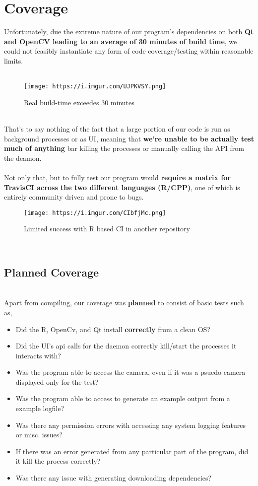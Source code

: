 \documentclass[12pt]{article}
\begin{document}
\section*{Coverage}
Unfortunately, due the extreme nature of our program's dependencies on both \textbf{Qt and OpenCV leading to an average of 30 minutes of build time}, we could not feasibly instantiate any form of code coverage/testing within reasonable limits.\\
\\\begin{figure}[width=0.25\textwidth]
    \centering
    \texttt{[image: https://i.imgur.com/UJPKVSY.png]}
    \caption{Real build-time exceedes 30 minutes}
\end{figure}
\\
That's to say nothing of the fact that a large portion of our code is run as background processes or as UI, meaning that \textbf{we're unable to be actually test much of anything} bar killing the processes or manually calling the API from the deamon.
\\
\\Not only that, but to fully test our program would \textbf{require a matrix for TravisCI across the two different languages (R/CPP)}, one of which is entirely community driven and prone to bugs.
\begin{figure}[width=0.25\textwidth]
    \centering
    \texttt{[image: https://i.imgur.com/CIbfjMc.png]}
    \caption{Limited success with R based CI in another repository}
\end{figure}
\pagebreak
\\\subsection*{Planned Coverage}
\\Apart from compiling, our coverage was \textbf{planned} to consist of basic tests such as,
\\\begin{itemize}
  \\\item Did the R, OpenCv, and Qt install \textbf{correctly} from a clean OS?
  \\\item Did the UI's api calls for the daemon correctly kill/start the processes it interacts with?
  \\\item Was the program able to access the camera, even if it was a psuedo-camera displayed only for the test?
  \\\item Was the program able to access to generate an example output from a example logfile?
  \\\item Was there any permission errors with accessing any system logging features or misc. issues?
  \\\item If there was an error generated from any particular part of the program, did it kill the process correctly?
  \\\item Was there any issue with generating downloading dependencies? 
\end{itemize}
\pagebreak
\end{document}
